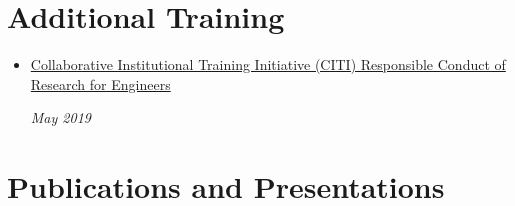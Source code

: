 \documentclass[\ifdefined\cv10pt\else10pt\fi,letterpaper]{moderncv}
\newcommand{\cvonly}[1]{\ifdefined\cv#1\fi\ignorespaces}
\renewcommand{\cvitem}[2]{\item {#1}\hfill\textit{#2}}
\let\oldsection\section
\renewcommand{\section}[1]{\vspace*{-1.3ex}\oldsection{#1}\vspace*{-0.5ex}}
\begin{document}

\section{Additional Training}
\begin{itemize}
	\cvitem{
		\parbox[t]{0.85\linewidth}{\href{https://about.citiprogram.org/en/series/responsible-conduct-of-research-rcr/}{Collaborative Institutional Training Initiative (CITI) Responsible Conduct of Research for Engineers}}}{May 2019}
\end{itemize}


\section{Publications and Presentations}
	\nocite{*}
	\printbibliography[heading=none]{}
\end{document}
